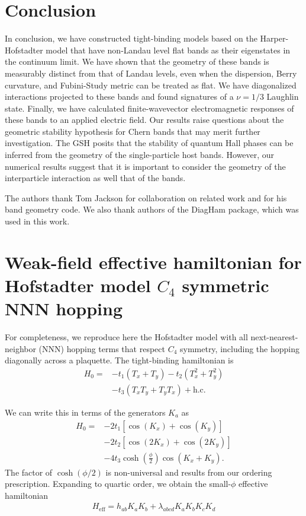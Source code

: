 \documentclass[aps,prb,twocolumn,letterpaper,twoside,nobalancelastpage,groupedaddress,amsmath,amssymb,floatfix,citeautoscript]{revtex4-1}
\begin{document}
\section{Conclusion}
In conclusion, we have constructed tight-binding models based on the Harper-Hofstadter model that have non-Landau level flat bands as their eigenstates in the continuum limit. We have shown that the geometry of these bands is measurably distinct from that of Landau levels, even when the dispersion, Berry curvature, and Fubini-Study metric can be treated as flat. We have diagonalized interactions projected to these bands and found signatures of a $\nu=1/3$ Laughlin state. Finally, we have calculated finite-wavevector electromagnetic responses of these bands to an applied electric field.
Our results raise questions about the geometric stability hypothesis for Chern bands that may merit further investigation. The GSH posits that the stability of quantum Hall phases can be inferred from the geometry of the single-particle host bands. However, our numerical results suggest that it is important to consider the geometry of the interparticle interaction as well that of the bands.


\begin{acknowledgments}
The authors thank Tom Jackson for collaboration on related work and for his band geometry code. We also thank authors of the DiagHam package, which was used in this work.

\end{acknowledgments}


%

\clearpage
\appendix
\section{Weak-field effective hamiltonian for Hofstadter model $C_4$ symmetric NNN hopping}
For completeness, we reproduce here the  Hofstadter model with all next-nearest-neighbor (NNN) hopping terms that respect $C_4$ symmetry, including the hopping diagonally across a plaquette. The tight-binding hamiltonian is
\begin{align*}
H_0 = &-t_1 \left(T_x + T_y\right)\nonumber - t_2 \left(T_x^{2} + T_y^{2}\right)\\ &- t_3 \left(T_xT_y + T_y T_x\right) + \text{h.c.}
\end{align*}

We can write this in terms of the generators $K_a$ as
\begin{align*}
H_0 = &-2t_1 \left[\cos\left(K_x\right) + \cos\left(K_y\right)\right]\\ &-2t_2 \left[\cos\left(2K_x\right)+\cos\left(2K_y\right)\right]\\ &- 4t_3 \cosh\left(\frac{\phi}{2}\right)\cos\left(K_x + K_y\right).
\end{align*}
The factor of $\cosh(\phi/2)$ is non-universal and results from our ordering prescription. Expanding to quartic order, we obtain the small-$\phi$ effective hamiltonian
\begin{align*}
H_{\text{eff}} = h_{ab}K_a K_b + \lambda_{abcd} K_a K_b K_c K_d 
\end{align*}
\end{document}
